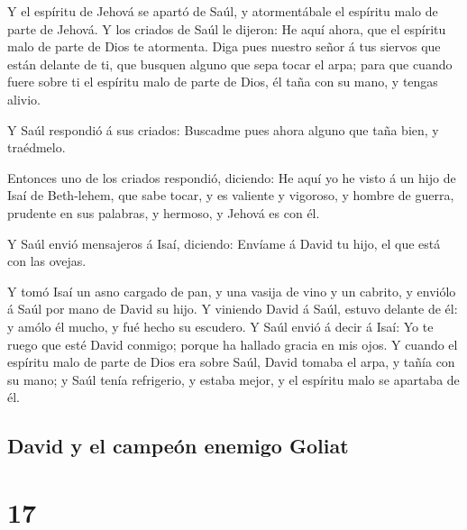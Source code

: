  Y el espíritu de Jehová se apartó de Saúl, y
atormentábale el espíritu malo de parte de Jehová.  Y los
criados de Saúl le dijeron: He aquí ahora, que el espíritu malo de parte
de Dios te atormenta.  Diga pues nuestro señor á tus
siervos que están delante de ti, que busquen alguno que sepa tocar el
arpa; para que cuando fuere sobre ti el espíritu malo de parte de Dios,
él taña con su mano, y tengas alivio.

 Y Saúl respondió á sus criados: Buscadme pues ahora
alguno que taña bien, y traédmelo.

 Entonces uno de los criados respondió, diciendo: He aquí
yo he visto á un hijo de Isaí de Beth-lehem, que sabe tocar, y es
valiente y vigoroso, y hombre de guerra, prudente en sus palabras, y
hermoso, y Jehová es con él.

 Y Saúl envió mensajeros á Isaí, diciendo: Envíame á
David tu hijo, el que está con las ovejas.

 Y tomó Isaí un asno cargado de pan, y una vasija de vino
y un cabrito, y enviólo á Saúl por mano de David su hijo.
 Y viniendo David á Saúl, estuvo delante de él: y amólo
él mucho, y fué hecho su escudero.  Y Saúl envió á decir
á Isaí: Yo te ruego que esté David conmigo; porque ha hallado gracia en
mis ojos.  Y cuando el espíritu malo de parte de Dios era
sobre Saúl, David tomaba el arpa, y tañía con su mano; y Saúl tenía
refrigerio, y estaba mejor, y el espíritu malo se apartaba de él.

\hypertarget{david-y-el-campeuxf3n-enemigo-goliat}{%
\subsection{David y el campeón enemigo
Goliat}\label{david-y-el-campeuxf3n-enemigo-goliat}}

\hypertarget{section-09-17}{%
\section{17}\label{section-09-17}}

